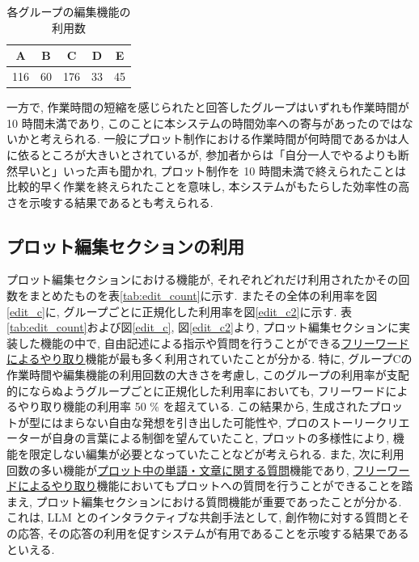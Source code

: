 \documentclass[a4j,12pt]{jsreport}
\begin{document}
\begin{table}[H]
\begin{center}
{\caption{各グループの編集機能の利用数}
\label{tab:edit}
\begin{tabular}{ccccc} \hline
A & B & C & D & E  \\ \hline
116 & 60 & 176 & 33 & 45\\
\hline
\end{tabular}
}
\end{center}
\end{table}

一方で, 作業時間の短縮を感じられたと回答したグループはいずれも作業時間が 10 時間未満であり, このことに本システムの時間効率への寄与があったのではないかと考えられる. 一般にプロット制作における作業時間が何時間であるかは人に依るところが大きいとされているが, 参加者からは「自分一人でやるよりも断然早いと」いった声も聞かれ, プロット制作を 10 時間未満で終えられたことは比較的早く作業を終えられたことを意味し, 本システムがもたらした効率性の高さを示唆する結果であるとも考えられる.

\subsection{プロット編集セクションの利用}\label{subsec: edit_result}
プロット編集セクションにおける機能が, それぞれどれだけ利用されたかその回数をまとめたものを表\ref{tab:edit_count}に示す. またその全体の利用率を図\ref{edit_c}に, グループごとに正規化した利用率を図\ref{edit_c2}に示す. 表\ref{tab:edit_count}および図\ref{edit_c}, 図\ref{edit_c2}より, プロット編集セクションに実装した機能の中で, 自由記述による指示や質問を行うことができる\hyperref[subsec: freeword]{フリーワードによるやり取り}機能が最も多く利用されていたことが分かる. 特に, グループCの作業時間や編集機能の利用回数の大きさを考慮し, このグループの利用率が支配的にならぬようグループごとに正規化した利用率においても, フリーワードによるやり取り機能の利用率 50 \% を超えている. この結果から, 生成されたプロットが型にはまらない自由な発想を引き出した可能性や, プロのストーリークリエーターが自身の言葉による制御を望んていたこと, プロットの多様性により, 機能を限定しない編集が必要となっていたことなどが考えられる. また, 次に利用回数の多い機能が\hyperref[subsec: question]{プロット中の単語・文章に関する質問}機能であり, \hyperref[subsec: freeword]{フリーワードによるやり取り}機能においてもプロットへの質問を行うことができることを踏まえ, プロット編集セクションにおける質問機能が重要であったことが分かる. これは, LLM とのインタラクティブな共創手法として, 創作物に対する質問とその応答, その応答の利用を促すシステムが有用であることを示唆する結果であるといえる.
\end{document}
